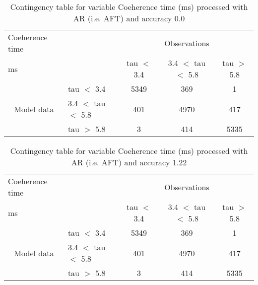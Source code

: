 \documentclass[11pt,english]{article}
\begin{document}
\begin{table}[]
\begin{center}
\begin{tabular}{llccc}
\hline
{Coeherence time}                                       &                                                    & \multicolumn{3}{c}{Observations}                 \\
{ms}                                       &                             & tau $<$ 3.4   & 3.4 $<$ tau $<$ 5.8 & tau $>$ 5.8 \\
\hline
\multicolumn{1}{c}{\multirow{3}{*}{Model data}}  & tau $<$ 3.4             & 5349                & 369                       & 1              \\
                                                 & 3.4  $<$ tau $<$ 5.8 & 401                & 4970                       & 417              \\
                                                 & tau $>$ 5.8             & 3                & 414                       & 5335              \\
\hline
\end{tabular}
\end{center}
\caption{Contingency table for variable Coeherence time (ms) processed with AR (i.e. AFT) and accuracy 0.0}
\label{tab:contingencytauAFT}
\end{table}
\begin{table}[]
\begin{center}
\begin{tabular}{llccc}
\hline
{Coeherence time}                                       &                                                    & \multicolumn{3}{c}{Observations}                 \\
{ms}                                       &                             & tau $<$ 3.4   & 3.4 $<$ tau $<$ 5.8 & tau $>$ 5.8 \\
\hline
\multicolumn{1}{c}{\multirow{3}{*}{Model data}}  & tau $<$ 3.4             & 5349                & 369                       & 1              \\
                                                 & 3.4  $<$ tau $<$ 5.8 & 401                & 4970                       & 417              \\
                                                 & tau $>$ 5.8             & 3                & 414                       & 5335              \\
\hline
\end{tabular}
\end{center}
\caption{Contingency table for variable Coeherence time (ms) processed with AR (i.e. AFT) and accuracy 1.22}
\label{tab:contingencytauAFT}
\end{table}
\end{document}
